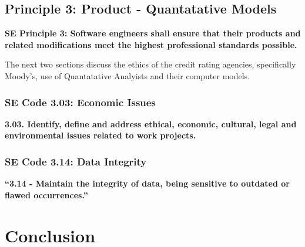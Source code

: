 \documentclass[11pt]{article}
\begin{document}
\begin{multicols}{2}
\subsection{Principle 3: Product - Quantatative Models}

\textbf{SE Principle 3: Software engineers shall ensure that their products and related modifications meet the highest professional standards possible.}

The next two sections discuss the ethics of the credit rating agencies, specifically Moody's, use of Quantatative Analyists and their computer models.  

\subsubsection{SE Code 3.03: Economic Issues}

   \textbf{3.03. Identify, define and address ethical, economic, cultural, legal and environmental issues related to work projects.}

\subsubsection{SE Code 3.14: Data Integrity}


   \textbf{``3.14 - Maintain the integrity of data, being sensitive to outdated or flawed occurrences.''}



\section{Conclusion}

\end{multicols}
\newpage


\nocite{*}




\end{document}
